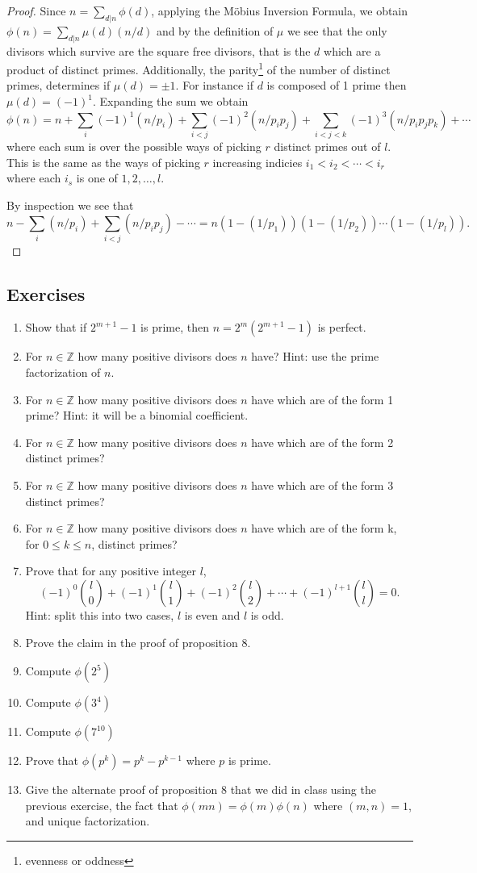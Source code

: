 \documentclass{article}
\theoremstyle{problemstyle}
\begin{document}
\begin{proof}
Since $n = \sum_{d|n}\phi(d)$, applying the M\"obius Inversion Formula, we obtain $\phi(n) = \sum_{d|n}\mu(d)(n/d)$ and by the definition of $\mu$ we see that the only divisors which survive are the square free divisors, that is the $d$ which are a product of distinct primes. Additionally, the parity\footnote{evenness or oddness} of the number of distinct primes, determines if $\mu(d) = \pm 1$. For instance if $d$ is composed of 1 prime then $\mu(d) = (-1)^1$. Expanding the sum we obtain $$\phi(n) = n + \sum_i(-1)^1(n/p_i) + \sum_{i < j}(-1)^2(n/p_ip_j) + \sum_{i < j< k}(-1)^3(n/p_ip_jp_k) + \cdots $$ where each sum is over the possible ways of picking $r$ distinct primes out of $l$. This is the same as the ways of picking $r$ increasing indicies $i_1 < i_2 < \cdots < i_r$  where each $i_s$ is one of $1,2,\ldots,l$. 

By inspection we see that $$n - \sum_i(n/p_i) + \sum_{i < j}(n/p_ip_j) - \cdots = n(1-(1/p_1))(1-(1/p_2))\cdots(1-(1/p_l)).$$
\end{proof}


\subsection*{Exercises}
\begin{enumerate}
\item Show that if $2^{m+1}-1$ is prime, then $n = 2^m(2^{m+1}-1)$ is perfect.
\item For $n \in \mathbb{Z}$ how many positive divisors does $n$ have? Hint: use the prime factorization of $n$.
\item For $n \in \mathbb{Z}$ how many positive divisors does $n$ have which are of the form 1 prime? Hint: it will be a binomial coefficient. 
\item For $n \in \mathbb{Z}$ how many positive divisors does $n$ have which are of the form 2 distinct primes? 
\item For $n \in \mathbb{Z}$ how many positive divisors does $n$ have which are of the form 3 distinct primes? 
\item For $n \in \mathbb{Z}$ how many positive divisors does $n$ have which are of the form k, for $0 \leq k \leq n$, distinct primes? 
\item Prove that for any positive integer $l$, $$(-1)^0\binom{l}{0} + (-1)^1\binom{l}{1} + (-1)^2\binom{l}{2}+\cdots+(-1)^{l+1}\binom{l}{l} = 0.$$ Hint: split this into two cases, $l$ is even and $l$ is odd.   
\item Prove the claim in the proof of proposition 8. 
\item Compute $\phi(2^5)$
\item Compute $\phi(3^4)$
\item Compute $\phi(7^{10})$
\item Prove that $\phi(p^k) = p^k - p^{k-1}$ where $p$ is prime. 
\item Give the alternate proof of proposition 8 that we did in class using the previous exercise, the fact that $\phi(mn) = \phi(m)\phi(n)$ where $(m,n) = 1$, and unique factorization. 
\end{enumerate}
\end{document}
